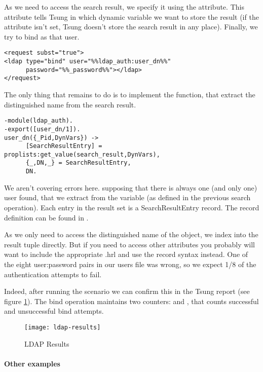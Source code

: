 \documentclass{TSUNG-en}
\begin{document}
As we need to access the search result, we specify it using the  attribute. This attribute tells Tsung in which dynamic variable we want to store the result (if the  attribute isn't set, Tsung doesn't store the search result in any place).
Finally,  we try to bind as that user.
\begin{Verbatim}
<request subst="true">
<ldap type="bind" user="%%ldap_auth:user_dn%%"
      password="%%_password%%"></ldap>
</request>
\end{Verbatim}
The only thing that remains to do is to implement the  function, that extract the distinguished name from the search result.

\begin{Verbatim}
-module(ldap_auth).
-export([user_dn/1]).
user_dn({_Pid,DynVars}) ->
      [SearchResultEntry] = proplists:get_value(search_result,DynVars),
      {_,DN,_} = SearchResultEntry,
      DN.
\end{Verbatim}

We aren't covering errors here. supposing that there is always one (and only one) user found, that we extract from the  variable (as defined in the previous search operation).
Each entry in the result set is a SearchResultEntry record. The record definition can be found in .

As we only need to access the distinguished name of the object, we index into the result tuple directly. But if you need to access other attributes you probably will want to include the appropriate .hrl and use the record syntax instead. One of the eight user:password pairs in our users file was wrong, so we expect 1/8 of the authentication attempts to fail.

Indeed, after running the scenario we can confirm this in the Tsung
report (see figure \ref{fig:ldap:results}). The bind operation maintains two
counters:  and ,
that counts successful and unsuccessful bind attempts.

\begin{figure}[htb]
  \begin{center}
    \texttt{[image: ldap-results]}
    \end{center}
      \caption{LDAP Results}
    \label{fig:ldap:results}
\end{figure}

\paragraph{Other examples}
\end{document}

